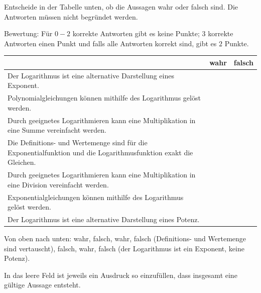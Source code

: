 \documentclass[11pt]{exam}
\begin{document}
\begin{questions}
\question[2]
Entscheide in der Tabelle unten, ob die Aussagen wahr oder falsch sind. Die Antworten müssen nicht begründet werden.\newline
\begin{small}
    Bewertung: Für $0-2$ korrekte Antworten gibt es keine Punkte; $3$ korrekte Antworten einen Punkt und falls alle Antworten korrekt sind, gibt es $2$ Punkte.
\end{small}
\begin{table}[h]
    \centering
    \begin{tabular}{|p{12cm}|c|c|}\hline
         & wahr & falsch \\\hline
        Der Logarithmus ist eine alternative Darstellung eines Exponent. & & \\\hline
        Polynomialgleichungen können mithilfe des Logarithmus gelöst werden. & & \\\hline
        Durch geeignetes Logarithmieren kann eine Multiplikation in eine Summe vereinfacht werden. & & \\\hline
        Die Definitions- und Wertemenge sind für die Exponentialfunktion und die Logarithmusfunktion exakt die Gleichen. & & \\\hline
        Durch geeignetes Logarithmieren kann eine Multiplikation in eine Division vereinfacht werden. & & \\\hline
        Exponentialgleichungen können mithilfe des Logarithmus gelöst werden. & & \\\hline
        Der Logarithmus ist eine alternative Darstellung eines Potenz. & & \\\hline
    \end{tabular}
\end{table}
{\begin{solution}
		Von oben nach unten: wahr, falsch, wahr, falsch (Definitions- und Wertemenge sind vertauscht), falsch, wahr, falsch (der Logarithmus ist ein Exponent, keine Potenz).
\end{solution}}
{}


\question[4]
In das leere Feld ist jeweils ein Ausdruck so einzufüllen, dass insgesamt eine gültige Aussage entsteht.
\end{questions}
\end{document}
